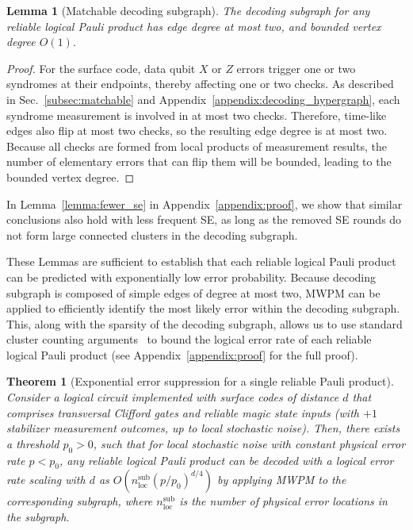 \documentclass[prx,twocolumn,secnumarabic,balancelastpage,amsmath,amssymb,longbibliography]{revtex4-2}
\newtheorem{theorem}[thm]{Theorem}
\newtheorem{lemma}[thm]{Lemma}
\begin{document}
\begin{lemma}[Matchable decoding subgraph]
The decoding subgraph for any reliable logical Pauli product has edge degree at most two, and bounded vertex degree $O(1)$. \label{lemma:matchable}
\end{lemma}
\begin{proof}
For the surface code, data qubit $X$ or $Z$ errors trigger one or two syndromes at their endpoints, thereby affecting one or two checks.
%
As described in Sec.~\ref{subsec:matchable} and Appendix~\ref{appendix:decoding_hypergraph}, each syndrome measurement is involved in at most two checks.
%
Therefore, time-like edges also flip at most two checks, so the resulting edge degree is at most two.
%
Because all checks are formed from local products of measurement results, the number of elementary errors that can flip them will be bounded, leading to the bounded vertex degree.
\end{proof}
\noindent In Lemma~\ref{lemma:fewer_se} in Appendix~\ref{appendix:proof}, we show that similar conclusions also hold with less frequent SE, as long as the removed SE rounds do not form large connected clusters in the decoding subgraph.

These Lemmas are sufficient to establish that each reliable logical Pauli product can be predicted with exponentially low error probability. 
%
Because decoding subgraph is composed of simple edges of degree at most two, MWPM can be applied to efficiently identify the most likely error within the decoding subgraph.
%
This, along with the sparsity of the decoding subgraph, allows us to use standard cluster counting arguments~\cite{kovalev2013fault,gottesman2013fault} to bound the logical error rate of each reliable logical Pauli product (see Appendix~\ref{appendix:proof} for the full proof).

\begin{theorem}[Exponential error suppression for a single reliable Pauli product]
\label{thm:single_product}
Consider a logical circuit implemented with surface codes of distance $d$ that comprises transversal Clifford gates and reliable magic state inputs (with $+1$ stabilizer measurement outcomes, up to local stochastic noise).
Then, there exists a threshold $p_0 > 0$, such that for local stochastic noise with constant physical error rate $p < p_0$, any reliable logical Pauli product can be decoded with a logical error rate scaling with $d$ as $O(n^{\mathrm{sub}}_{\mathrm{loc}} (p/p_0)^{d/4})$ by applying MWPM to the corresponding subgraph, where $n^{\mathrm{sub}}_{\mathrm{loc}}$ is the number of physical error locations in the subgraph.
\end{theorem}
\end{document}
